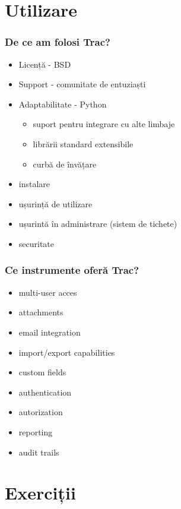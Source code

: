 \documentclass{beamer}
\begin{document}
\section{Utilizare}

  \frame{\tableofcontents[currentsection]}

  \begin{frame}
  \frametitle{De ce am folosi Trac?}

  \begin{itemize}
  \pause \item Licență - BSD
  \pause \item Support - comunitate de entuziaști
  \pause \item Adaptabilitate - Python 
	\begin{itemize}
	\item suport pentru integrare cu alte limbaje
	\item librării standard extensibile
	\item curbă de învățare
	\end{itemize}
  \pause \item instalare
  \pause \item ușurință de utilizare
  \pause \item ușurintă în administrare (sistem de tichete)
  \pause \item securitate
  \end{itemize}
  \end{frame}

  \begin{frame}
  \frametitle{Ce instrumente oferă Trac?}

  \begin{itemize}
  \pause \item multi-user acces
  \pause \item attachments
  \pause \item email integration
  \pause \item import/export capabilities 
  \pause \item custom fields
  \pause \item authentication
  \pause \item autorization
  \pause \item reporting
  \pause \item audit trails
  \end{itemize}
  \end{frame}

\section{Exerciții}
\end{document}
